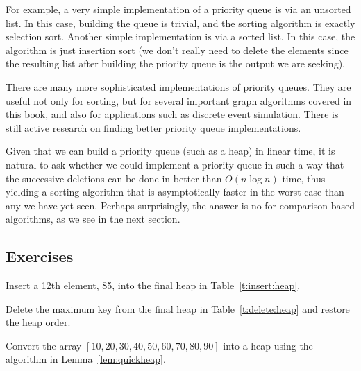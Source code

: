 For example, a very simple implementation of a priority queue is via an unsorted list.
In this case, building the queue is trivial, and the sorting algorithm is exactly
selection sort. Another simple implementation is via a sorted list. In this case,
the algorithm is just insertion sort (we don't really need to delete the elements
since the resulting list after building the priority queue is the output we are seeking). 

There are many more sophisticated implementations of priority queues. They are 
useful not only for sorting, but for several important graph algorithms covered 
in this book, and also for applications such as discrete event simulation. There
is still active research on finding better priority queue implementations.

Given that we can build a priority queue (such as a heap) in linear time, it is 
natural to ask whether we could implement a priority queue in such a way that 
the successive deletions can be done in better than $O(n\log n)$ time, thus 
yielding a sorting algorithm that is asymptotically faster in the worst case 
than any we have yet seen. Perhaps surprisingly, the answer is no for 
comparison-based algorithms, as we see in the next section.

\subsection*{Exercises}

\begin{Exercise}\label{exr:insert:heap}
Insert a 12th element, 85, into the final heap in Table~\ref{t:insert:heap}.
\end{Exercise}


\begin{Exercise}\label{exr:delete:heap}
Delete the maximum key from the final heap in Table~\ref{t:delete:heap}
and restore the heap order.
\end{Exercise}

\begin{Exercise}\label{exr:heap:build}
Convert the array \([10,20,30,40,50,60,70,80,90]\) into a heap 
using the algorithm in Lemma~\ref{lem:quickheap}.
\end{Exercise}

